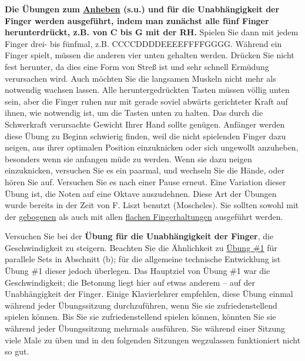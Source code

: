\textbf{Die Übungen zum \hyperref[c1iii7anheben]{Anheben} (s.u.) und für die Unabhängigkeit der Finger werden ausgeführt, indem man zunächst alle fünf Finger herunterdrückt, z.B. von C bis G mit der RH.}
Spielen Sie dann mit jedem Finger drei- bis fünfmal, z.B. CCCCDDDDEEEEFFFFGGGG.
Während ein Finger spielt, müssen die anderen vier unten gehalten werden.
Drücken Sie nicht fest herunter, da dies eine Form von Streß ist und sehr schnell Ermüdung verursachen wird.
Auch möchten Sie die langsamen Muskeln nicht mehr als notwendig wachsen lassen.
Alle heruntergedrückten Tasten müssen völlig unten sein, aber die Finger ruhen nur mit gerade soviel abwärts gerichteter Kraft auf ihnen, wie notwendig ist, um die Tasten unten zu halten.
Das durch die Schwerkraft verursachte Gewicht Ihrer Hand sollte genügen.
Anfänger werden diese Übung zu Beginn schwierig finden, weil die nicht spielenden Finger dazu neigen, aus ihrer optimalen Position einzuknicken oder sich ungewollt anzuheben, besonders wenn sie anfangen müde zu werden.
Wenn sie dazu neigen einzuknicken, versuchen Sie es ein paarmal, und wechseln Sie die Hände, oder hören Sie auf.
Versuchen Sie es nach einer Pause erneut.
Eine Variation dieser Übung ist, die Noten auf eine Oktave auszudehnen.
Diese Art der Übungen wurde bereits in der Zeit von F. Liszt benutzt (Moscheles).
Sie sollten sowohl mit der \hyperref[c1ii2]{gebogenen} als auch mit allen \hyperref[c1iii4b]{flachen Fingerhaltungen} ausgeführt werden.

Versuchen Sie bei der \textbf{Übung für die Unabhängigkeit der Finger}, die Geschwindigkeit zu steigern.
Beachten Sie die Ähnlichkeit zu \hyperref[c1iii7b1]{Übung \#1} für parallele Sets in Abschnitt (b); für die allgemeine technische Entwicklung ist Übung \#1 dieser jedoch überlegen.
Das Hauptziel von Übung \#1 war die Geschwindigkeit; die Betonung liegt hier auf etwas anderem -- auf der Unabhängigkeit der Finger.
Einige Klavierlehrer empfehlen, diese Übung einmal während jeder Übungssitzung durchzuführen, wenn Sie sie zufriedenstellend spielen können.
Bis Sie sie zufriedenstellend spielen können, könnten Sie sie während jeder Übungssitzung mehrmals ausführen.
Sie während einer Sitzung viele Male zu üben und in den folgenden Sitzungen wegzulassen funktioniert nicht so gut.


